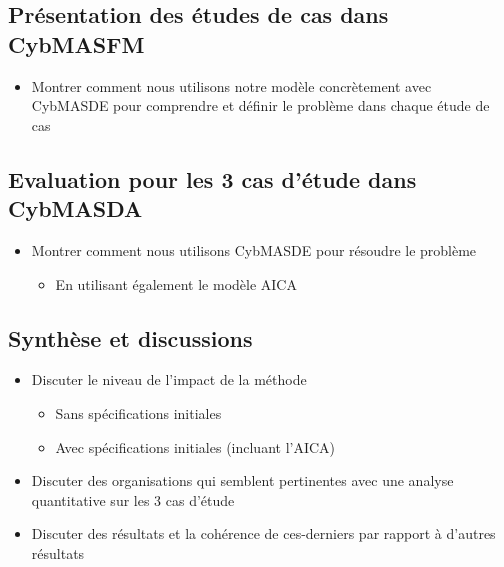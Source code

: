 \subsection{Présentation des études de cas dans CybMASFM}
\begin{itemize}

    \item Montrer comment nous utilisons notre modèle concrètement avec CybMASDE pour comprendre et définir le problème dans chaque étude de cas
\end{itemize}

\subsection{Evaluation pour les 3 cas d’étude dans CybMASDA}
\begin{itemize}

    \item Montrer comment nous utilisons CybMASDE pour résoudre le problème
          \begin{itemize}
              \item En utilisant également le modèle AICA
          \end{itemize}
\end{itemize}

\subsection{Synthèse et discussions}
\begin{itemize}

    \item Discuter le niveau de l'impact de la méthode
          \begin{itemize}
              \item Sans spécifications initiales
              \item Avec spécifications initiales (incluant l'AICA)
          \end{itemize}
    \item Discuter des organisations qui semblent pertinentes avec une analyse quantitative sur les 3 cas d'étude
    \item Discuter des résultats et la cohérence de ces-derniers par rapport à d'autres résultats
\end{itemize}
